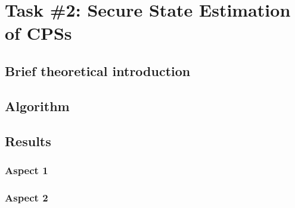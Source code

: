\section*{Task \#2: Secure State Estimation of CPSs}

\subsection*{Brief theoretical introduction}

\subsection*{Algorithm}

\subsection*{Results}


\subsubsection*{Aspect 1}

\subsubsection*{Aspect 2}
